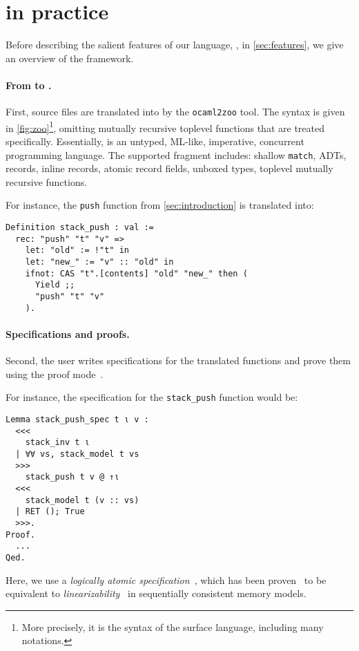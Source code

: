 \section{\Zoo in practice}
\label{sec:zoo}



Before describing the salient features of our language, \Zoo, in \cref{sec:features}, we give an overview of the framework.

\paragraph{From \OCaml to \Zoo.}

First, \OCaml source files are translated into \Zoo by the \texttt{ocaml2zoo} tool.
The \Zoo syntax is given in \cref{fig:zoo}\footnote{More precisely, it is the syntax of the surface language, including many \Coq notations.}, omitting mutually recursive toplevel functions that are treated specifically.
Essentially, \Zoo is an untyped, ML-like, imperative, concurrent programming language.
The supported \OCaml fragment includes: shallow \texttt{match}, ADTs, records, inline records, atomic record fields, unboxed types, toplevel mutually recursive functions.

For instance, the \texttt{push} function from \cref{sec:introduction} is translated into:

\begin{verbatim}
Definition stack_push : val :=
  rec: "push" "t" "v" =>
    let: "old" := !"t" in
    let: "new_" := "v" :: "old" in
    ifnot: CAS "t".[contents] "old" "new_" then (
      Yield ;;
      "push" "t" "v"
    ).
\end{verbatim}

\paragraph{Specifications and proofs.}

Second, the user writes specifications for the translated functions and prove them using the \Iris proof mode~\cite{DBLP:journals/pacmpl/KrebbersJ0TKTCD18}.

For instance, the specification for the \texttt{stack_push} function would be:

\begin{verbatim}
Lemma stack_push_spec t ι v :
  <<<
    stack_inv t ι
  | ∀∀ vs, stack_model t vs
  >>>
    stack_push t v @ ↑ι
  <<<
    stack_model t (v :: vs)
  | RET (); True
  >>>.
Proof.
  ...
Qed.
\end{verbatim}

Here, we use a \emph{logically atomic specification}~\cite{DBLP:conf/ecoop/PintoDG14}, which has been proven~\cite{DBLP:journals/pacmpl/BirkedalDGJST21} to be equivalent to \emph{linearizability}~\cite{DBLP:journals/toplas/HerlihyW90} in sequentially consistent memory models.
